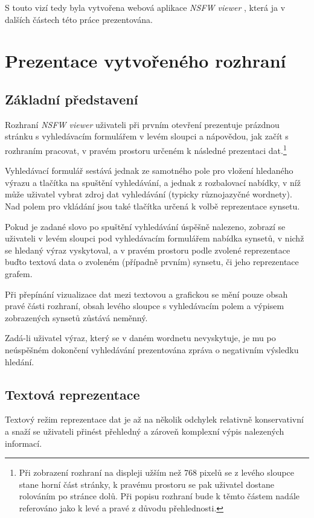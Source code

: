 \documentclass[a4paper, 11pt, oneside]{book}
\newcommand{\simplywn}{\textit{NSFW viewer} }
\begin{document}
				S touto vizí tedy byla vytvořena webová aplikace \simplywn, která ja v dalších částech této práce prezentována.

		\chapter{Prezentace vytvořeného rozhraní}
		\label{cha:ui}

			\section{Základní představení}

				Rozhraní \simplywn uživateli při prvním otevření prezentuje prázdnou stránku s vyhledávacím formulářem v levém sloupci a nápovědou, jak začít s rozhraním pracovat, v pravém prostoru určeném k následné prezentaci dat.\footnote{Při zobrazení rozhraní na displeji užším než 768 pixelů se z levého sloupce stane horní část stránky, k pravému prostoru se pak uživatel dostane rolováním po stránce dolů. Při popisu rozhraní bude k těmto částem nadále referováno jako k levé a pravé z důvodu přehlednosti.}

				Vyhledávací formulář sestává jednak ze samotného pole pro vložení hledaného výrazu a tlačítka na spuštění vyhledávání, a jednak z rozbalovací nabídky, v níž může uživatel vybrat zdroj dat vyhledávání (typicky různojazyčné wordnety). Nad polem pro vkládání jsou také tlačítka určená k volbě reprezentace synsetu.

				Pokud je zadané slovo po spuštění vyhledávání úspěšně nalezeno, zobrazí se uživateli v levém sloupci pod vyhledávacím formulářem nabídka synsetů, v nichž se hledaný výraz vyskytoval, a v pravém prostoru podle zvolené reprezentace buďto textová data o zvoleném (případně prvním) synsetu, či jeho reprezentace grafem.

				Při přepínání vizualizace dat mezi textovou a grafickou se mění pouze obsah pravé části rozhraní, obsah levého sloupce s vyhledávacím polem a výpisem zobrazených synsetů zůstává neměnný.

				Zadá-li uživatel výraz, který se v daném wordnetu nevyskytuje, je mu po neúspěšném dokončení vyhledávání prezentována zpráva o negativním výsledku hledání. 

			\section{Textová reprezentace}

				Textový režim reprezentace dat je až na několik odchylek relativně konservativní a snaží se uživateli přinést přehledný a zároveň komplexní výpis nalezených informací. 
\end{document}
